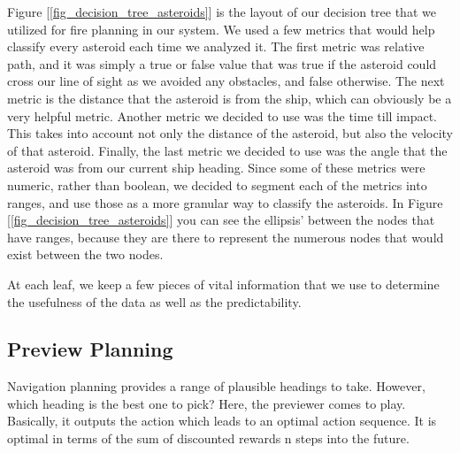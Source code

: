 \documentclass[10pt,draft,conference]{IEEEtran}
\begin{document}
Figure [\ref{fig_decision_tree_asteroids}] is the layout of our decision tree that we utilized for fire planning in our system.  We used a few metrics that would help classify every asteroid each time we analyzed it.  The first metric was relative path, and it was simply a true or false value that was true if the asteroid could cross our line of sight as we avoided any obstacles, and false otherwise.  The next metric is the distance that the asteroid is from the ship, which can obviously be a very helpful metric.  Another metric we decided to use was the time till impact.  This takes into account not only the distance of the asteroid, but also the velocity of that asteroid.  Finally, the last metric we decided to use was the angle that the asteroid was from our current ship heading.  Since some of these metrics were numeric, rather than boolean, we decided to segment each of the metrics into ranges, and use those as a more granular way to classify the asteroids.  In Figure [\ref{fig_decision_tree_asteroids}] you can see the ellipsis' between the nodes that have ranges, because they are there to represent the numerous nodes that would exist between the two nodes.

At each leaf, we keep a few pieces of vital information that we use to determine the usefulness of the data as well as the predictability.  

\subsection{Preview Planning}
Navigation planning provides a range of plausible headings to take. However, which heading is the best one to pick? Here, the previewer comes to play. Basically, it outputs the action which leads to an optimal action sequence. It is optimal in terms of the sum of discounted rewards n steps into the future.
\end{document}
